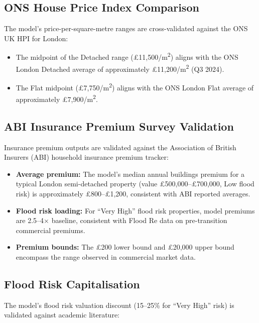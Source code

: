 \documentclass[11pt,a4paper]{article}
\begin{document}
\subsection{ONS House Price Index Comparison}

The model's price-per-square-metre ranges are cross-validated against
the ONS UK HPI for London:

\begin{itemize}
    \item The midpoint of the Detached range (\pounds11,500/m\textsuperscript{2})
          aligns with the ONS London Detached average of approximately
          \pounds11,200/m\textsuperscript{2} (Q3 2024).
    \item The Flat midpoint (\pounds7,750/m\textsuperscript{2}) aligns with
          the ONS London Flat average of approximately \pounds7,900/m\textsuperscript{2}.
\end{itemize}

\subsection{ABI Insurance Premium Survey Validation}

Insurance premium outputs are validated against the Association of British
Insurers (ABI) household insurance premium tracker:

\begin{itemize}
    \item \textbf{Average premium:} The model's median annual buildings
          premium for a typical London semi-detached property (value
          \pounds500,000--\pounds700,000, Low flood risk) is approximately
          \pounds800--\pounds1,200, consistent with ABI reported averages.
    \item \textbf{Flood risk loading:} For ``Very High'' flood risk
          properties, model premiums are 2.5--4$\times$ baseline, consistent
          with Flood Re data on pre-transition commercial premiums.
    \item \textbf{Premium bounds:} The \pounds200 lower bound and
          \pounds20,000 upper bound encompass the range observed in
          commercial market data.
\end{itemize}

\subsection{Flood Risk Capitalisation}

The model's flood risk valuation discount (15--25\% for ``Very High'' risk)
is validated against academic literature:
\end{document}
